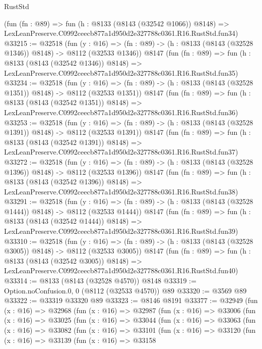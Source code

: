 \begin{lexlean}{RustStd}
\begin{coremodule}
    (fun (fn : @89) =>
    fun (h : @8133 (@8143 (@32542 @1066)) @8148) =>
    LexLeanPreserve.C0992ceecb877a1d950d2e327788c0361.R16.RustStd.fun34)
@33215 := @32518
    (fun (y : @16) =>
    (fn : @89) -> (h : @8133 (@8143 (@32528 @1346)) @8148) -> @8112 (@32533 @1346))
    @8147
    (fun (fn : @89) =>
    fun (h : @8133 (@8143 (@32542 @1346)) @8148) =>
    LexLeanPreserve.C0992ceecb877a1d950d2e327788c0361.R16.RustStd.fun35)
@33234 := @32518
    (fun (y : @16) =>
    (fn : @89) -> (h : @8133 (@8143 (@32528 @1351)) @8148) -> @8112 (@32533 @1351))
    @8147
    (fun (fn : @89) =>
    fun (h : @8133 (@8143 (@32542 @1351)) @8148) =>
    LexLeanPreserve.C0992ceecb877a1d950d2e327788c0361.R16.RustStd.fun36)
@33253 := @32518
    (fun (y : @16) =>
    (fn : @89) -> (h : @8133 (@8143 (@32528 @1391)) @8148) -> @8112 (@32533 @1391))
    @8147
    (fun (fn : @89) =>
    fun (h : @8133 (@8143 (@32542 @1391)) @8148) =>
    LexLeanPreserve.C0992ceecb877a1d950d2e327788c0361.R16.RustStd.fun37)
@33272 := @32518
    (fun (y : @16) =>
    (fn : @89) -> (h : @8133 (@8143 (@32528 @1396)) @8148) -> @8112 (@32533 @1396))
    @8147
    (fun (fn : @89) =>
    fun (h : @8133 (@8143 (@32542 @1396)) @8148) =>
    LexLeanPreserve.C0992ceecb877a1d950d2e327788c0361.R16.RustStd.fun38)
@33291 := @32518
    (fun (y : @16) =>
    (fn : @89) -> (h : @8133 (@8143 (@32528 @1444)) @8148) -> @8112 (@32533 @1444))
    @8147
    (fun (fn : @89) =>
    fun (h : @8133 (@8143 (@32542 @1444)) @8148) =>
    LexLeanPreserve.C0992ceecb877a1d950d2e327788c0361.R16.RustStd.fun39)
@33310 := @32518
    (fun (y : @16) =>
    (fn : @89) -> (h : @8133 (@8143 (@32528 @3005)) @8148) -> @8112 (@32533 @3005))
    @8147
    (fun (fn : @89) =>
    fun (h : @8133 (@8143 (@32542 @3005)) @8148) =>
    LexLeanPreserve.C0992ceecb877a1d950d2e327788c0361.R16.RustStd.fun40)
@33314 := @8133 (@8143 (@32528 @4570)) @8148
@33319 := Option.noConfusion.{0, 0} (@8112 (@32533 @4570)) @89
@33320 := @3569 @89
@33322 := @33319 @33320 @89
@33323 := @8146 @8191
@33377 := @32949
    (fun (x : @16) =>
    @32968
      (fun (x : @16) =>
      @32987
        (fun (x : @16) =>
        @33006
          (fun (x : @16) =>
          @33025
            (fun (x : @16) =>
            @33044
              (fun (x : @16) =>
              @33063
                (fun (x : @16) =>
                @33082
                  (fun (x : @16) =>
                  @33101
                    (fun (x : @16) =>
                    @33120
                      (fun (x : @16) =>
                      @33139
                        (fun (x : @16) =>
                        @33158

\end{coremodule}
\end{lexlean}
